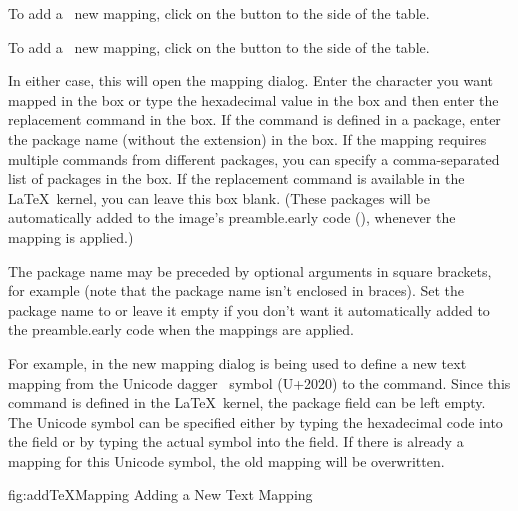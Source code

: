 To add a \textmode\ new mapping, \gls{click} on the
 button to the
side of the  table. 

To add a \mathsmode\ new mapping, \gls{click} on the
 button to the
side of the  table. 


In either case, this will open the  mapping
dialog. Enter the character you want mapped in the
 box or type the hexadecimal value in the
 box and then enter the replacement
command in the  box.  If the command is
defined in a package, enter the package name (without the 
extension) in the  box. If the mapping
requires multiple commands from different packages, you can specify
a comma-separated list of packages in the
 box. If the replacement command is
available in the \LaTeX\ kernel, you can leave this box blank.
(These packages will be automatically added to the
image's \gls{preamble.early} code (), whenever the
mapping is applied.)

The package name may be preceded by optional arguments in square
brackets, for example  (note that the package name
isn't enclosed in braces). Set the package name to  or
leave it empty if you don't want it automatically added to the
\gls{preamble.early} code when the mappings are applied.

For example, in  the new mapping dialog
is being used to define a new text mapping from the Unicode dagger
\textdagger\ symbol (U+2020) to the  command.
Since this command is defined in the \LaTeX\ kernel, the package
field can be left empty. The Unicode symbol can be specified either
by typing the hexadecimal code into the
 field or by typing the actual
symbol into the  field. If there
is already a mapping for this Unicode symbol, the old mapping will
be overwritten.

\FloatFig
  {fig:addTeXMapping}
  {}
  {Adding a New Text Mapping} 


